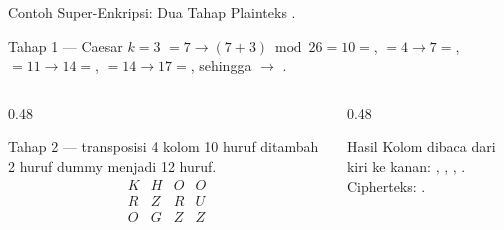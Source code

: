 \documentclass[aspectratio=169,11pt]{beamer}
\begin{document}
\begin{frame}{Contoh Super-Enkripsi: Dua Tahap}
    \footnotesize
    Plainteks .
    \vspace{0.05cm}
    \begin{block}{Tahap 1 --- Caesar $k=3$}
        $=7\rightarrow(7+3)\bmod 26=10=$,
        $=4\rightarrow7=$,
        $=11\rightarrow14=$,
        $=14\rightarrow17=$,
        sehingga  $\rightarrow$ .
    \end{block}
    \begin{columns}[T,onlytextwidth]
        \begin{column}{0.48\textwidth}
            \begin{block}{Tahap 2 --- transposisi 4 kolom}
                \footnotesize
                10 huruf ditambah 2 huruf dummy  menjadi 12 huruf.
                \[
                \begin{array}{cccc}
                    K&H&O&O\\
                    R&Z&R&U\\
                    O&G&Z&Z
                \end{array}
                \]
            \end{block}
        \end{column}
        \begin{column}{0.48\textwidth}
            \begin{exampleblock}{Hasil}
                \footnotesize
                Kolom dibaca dari kiri ke kanan: , ,
                , .\\
                Cipherteks: .
            \end{exampleblock}
        \end{column}
    \end{columns}
\end{frame}
\end{document}
